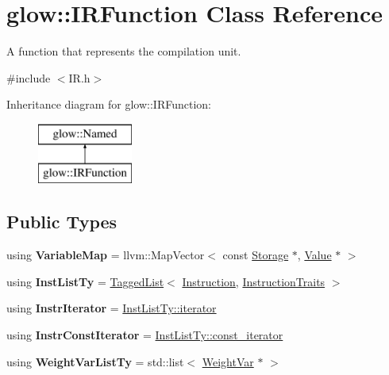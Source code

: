 \hypertarget{classglow_1_1_i_r_function}{}\section{glow\+:\+:I\+R\+Function Class Reference}
\label{classglow_1_1_i_r_function}


A function that represents the compilation unit.  




{\ttfamily \#include $<$I\+R.\+h$>$}

Inheritance diagram for glow\+:\+:I\+R\+Function\+:\begin{figure}[H]
\begin{center}
\leavevmode
\includegraphics[height=2.000000cm]{classglow_1_1_i_r_function}
\end{center}
\end{figure}
\subsection*{Public Types}
\begin{DoxyCompactItemize}
\item 
\mbox{\label{classglow_1_1_i_r_function_ac39ac110ee7d7b9773ce979fc6702e7e}} 
using {\bfseries Variable\+Map} = llvm\+::\+Map\+Vector$<$ const \hyperlink{classglow_1_1_storage}{Storage} $\ast$, \hyperlink{classglow_1_1_value}{Value} $\ast$ $>$
\item 
\mbox{\label{classglow_1_1_i_r_function_aa31cfb4442740abc3fefed751e36f6cb}} 
using {\bfseries Inst\+List\+Ty} = \hyperlink{classglow_1_1_tagged_list}{Tagged\+List}$<$ \hyperlink{classglow_1_1_instruction}{Instruction}, \hyperlink{structglow_1_1_instruction_traits}{Instruction\+Traits} $>$
\item 
\mbox{\label{classglow_1_1_i_r_function_a89c666cab8c011bb5092cdaa0a2e306b}} 
using {\bfseries Instr\+Iterator} = \hyperlink{classglow_1_1tagged__list__details_1_1_iterator}{Inst\+List\+Ty\+::iterator}
\item 
\mbox{\label{classglow_1_1_i_r_function_aaff9065d9b6753b3a22ca9b8eab23c9b}} 
using {\bfseries Instr\+Const\+Iterator} = \hyperlink{classglow_1_1tagged__list__details_1_1_iterator}{Inst\+List\+Ty\+::const\+\_\+iterator}
\item 
\mbox{\label{classglow_1_1_i_r_function_adf3b8b922c63d18841be49e1abde440d}} 
using {\bfseries Weight\+Var\+List\+Ty} = std\+::list$<$ \hyperlink{classglow_1_1_weight_var}{Weight\+Var} $\ast$ $>$
\end{DoxyCompactItemize}

